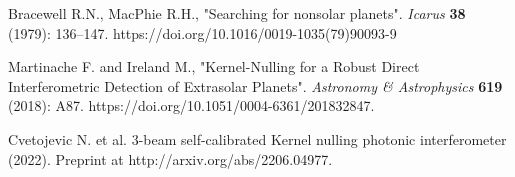 \documentclass[12pt]{article}
\begin{document}
\begin{thebibliography}{60}

 Bracewell R.N., MacPhie R.H., "Searching for nonsolar planets". {\it Icarus} \textbf{38} (1979): 136–147. https://doi.org/10.1016/0019-1035(79)90093-9

  Martinache F. and Ireland M., "Kernel-Nulling for a Robust Direct Interferometric Detection of Extrasolar Planets". {\it Astronomy \& Astrophysics} \textbf{619} (2018): A87. https://doi.org/10.1051/0004-6361/201832847.

 Cvetojevic N. et al. 3-beam self-calibrated Kernel nulling photonic interferometer (2022). Preprint at http://arxiv.org/abs/2206.04977.

\end{thebibliography}
\end{document}
